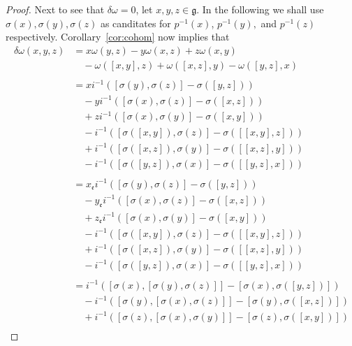 \begin{proof}
  Next to see that $ \delta \omega = 0 $, let $ x,y,z \in \mathfrak{g} $. In the following we shall use $ \sigma(x), \sigma(y), \sigma(z) $ as canditates for $ p^{-1}(x)$, $p ^{-1}(y), $ and $ p ^{-1}(z) $ respectively. Corollary~\ref{cor:cohom} now implies that
  \begin{align*}
    \delta \omega (x,y,z) &= x\omega(y, z) - y\omega(x, z) + z\omega(x,y) \\
                          &\quad -\omega([x,y], z) + \omega([x,z], y) - \omega([y,z], x) \\ \\
                          &= x i^{-1}([\sigma(y), \sigma(z)] - \sigma([y,z])) \\
                          &\quad -yi^{-1}([\sigma(x), \sigma(z)] - \sigma([x,z])) \\
                          &\quad +zi^{-1}([\sigma(x), \sigma(y)]- \sigma([x,y])) \\
                          &\quad - i^{-1}([\sigma([x, y]), \sigma(z)]-\sigma([[x,y], z])) \\
                          &\quad + i^{-1}([\sigma([x, z]), \sigma(y)] -\sigma([[x,z], y])) \\
                          &\quad - i^{-1}([\sigma([y, z]), \sigma(x)] -\sigma([[y,z], x])) \\ \\
                          &= x_{\mathfrak{e}}i^{-1}([\sigma(y), \sigma(z)] - \sigma([y,z])) \\
                          &\quad -y_{\mathfrak{e}}i^{-1}([\sigma(x), \sigma(z)] - \sigma([x,z])) \\
                          &\quad +z_{\mathfrak{e}}i^{-1}([\sigma(x), \sigma(y)]- \sigma([x,y])) \\
                          &\quad - i^{-1}([\sigma([x, y]), \sigma(z)]-\sigma([[x,y], z])) \\
                          &\quad + i^{-1}([\sigma([x, z]), \sigma(y)] -\sigma([[x,z], y])) \\
                          &\quad - i^{-1}([\sigma([y, z]), \sigma(x)] -\sigma([[y,z], x])) \\ \\
                          &= i^{-1}([\sigma(x), [\sigma(y), \sigma(z)]] - [\sigma(x), \sigma([y, z])]) \\
                          &\quad - i^{-1}([\sigma(y), [\sigma(x), \sigma(z)]] - [\sigma(y), \sigma([x, z])]) \\
                          &\quad + i^{-1}([\sigma(z), [\sigma(x), \sigma(y)]] - [\sigma(z), \sigma([x, y])]) \\

\end{align*}
\end{proof}

